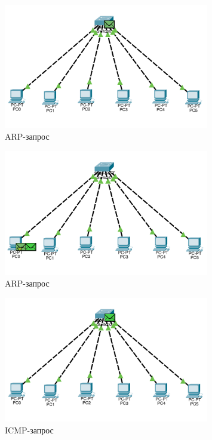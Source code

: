 \documentclass[a4paper, 14pt]{extarticle}
\begin{document}
\begin{figure}[H]
  \centering
  \includegraphics[width=0.8\textwidth]{images/task-1/arp-4.png}
  \caption{ARP-запрос}
  \label{fig:task-1:arp-4}
\end{figure}

\begin{figure}[H]
  \centering
  \includegraphics[width=0.8\textwidth]{images/task-1/arp-5.png}
  \caption{ARP-запрос}
  \label{fig:task-1:arp-5}
\end{figure}

\begin{figure}[H]
  \centering
  \includegraphics[width=0.8\textwidth]{images/task-1/pdu-1.png}
  \caption{ICMP-запрос}
  \label{fig:task-1:pdu-1}
\end{figure}
\end{document}

